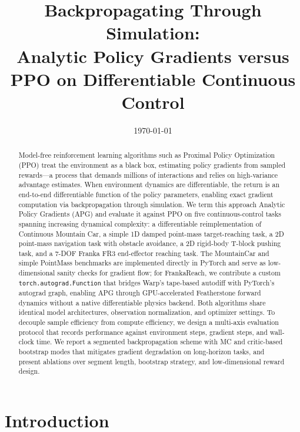 \documentclass[11pt,a4paper]{article}
\title{\textbf{Backpropagating Through Simulation: \\ Analytic Policy Gradients versus PPO on Differentiable Continuous Control}}
\author{
}
\date{\today}
\begin{document}
\maketitle

\begin{abstract}
Model-free reinforcement learning algorithms such as Proximal Policy Optimization (PPO) treat the environment as a black box, estimating policy gradients from sampled rewards—a process that demands millions of interactions and relies on high-variance advantage estimates. When environment dynamics are differentiable, the return is an end-to-end differentiable function of the policy parameters, enabling exact gradient computation via backpropagation through simulation. We term this approach Analytic Policy Gradients (APG) and evaluate it against PPO on five continuous-control tasks spanning increasing dynamical complexity: a differentiable reimplementation of Continuous Mountain Car, a simple 1D damped point-mass target-reaching task, a 2D point-mass navigation task with obstacle avoidance, a 2D rigid-body T-block pushing task, and a 7-DOF Franka FR3 end-effector reaching task. The MountainCar and simple PointMass benchmarks are implemented directly in PyTorch and serve as low-dimensional sanity checks for gradient flow; for FrankaReach, we contribute a custom \texttt{torch.autograd.Function} that bridges Warp's tape-based autodiff with PyTorch's autograd graph, enabling APG through GPU-accelerated Featherstone forward dynamics without a native differentiable physics backend. Both algorithms share identical model architectures, observation normalization, and optimizer settings. To decouple sample efficiency from compute efficiency, we design a multi-axis evaluation protocol that records performance against environment steps, gradient steps, and wall-clock time. We report a segmented backpropagation scheme with MC and critic-based bootstrap modes that mitigates gradient degradation on long-horizon tasks, and present ablations over segment length, bootstrap strategy, and low-dimensional reward design.
\end{abstract}

\section{Introduction}
\label{sec:introduction}
\end{document}
